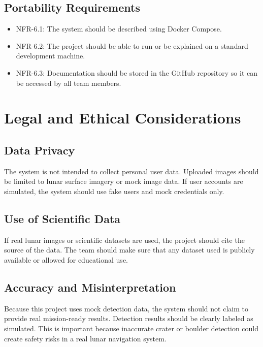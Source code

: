 \documentclass[12pt]{article}
\begin{document}
\subsection{Portability Requirements}

\begin{itemize}
    \item NFR-6.1: The system should be described using Docker Compose.
    \item NFR-6.2: The project should be able to run or be explained on a standard development machine.
    \item NFR-6.3: Documentation should be stored in the GitHub repository so it can be accessed by all team members.
\end{itemize}

\section{Legal and Ethical Considerations}

\subsection{Data Privacy}

The system is not intended to collect personal user data. Uploaded images should be limited to lunar surface imagery or mock image data. If user accounts are simulated, the system should use fake users and mock credentials only.

\subsection{Use of Scientific Data}

If real lunar images or scientific datasets are used, the project should cite the source of the data. The team should make sure that any dataset used is publicly available or allowed for educational use.

\subsection{Accuracy and Misinterpretation}

Because this project uses mock detection data, the system should not claim to provide real mission-ready results. Detection results should be clearly labeled as simulated. This is important because inaccurate crater or boulder detection could create safety risks in a real lunar navigation system.
\end{document}
